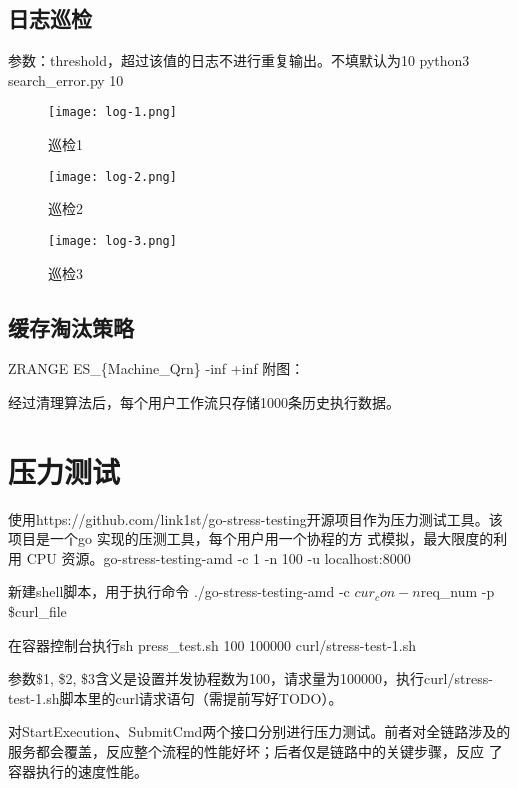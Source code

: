 \subsection{日志巡检}

参数：threshold，超过该值的日志不进行重复输出。不填默认为10
python3 search\_error.py 10

\begin{figure}
    \centering
    \texttt{[image: log-1.png]}
    \caption{巡检1}
    \label{fig:6-4-1}
\end{figure}

\begin{figure}
    \centering
    \texttt{[image: log-2.png]}
    \caption{巡检2}
    \label{fig:6-4-2}
\end{figure}

\begin{figure}
    \centering
    \texttt{[image: log-3.png]}
    \caption{巡检3}
    \label{fig:6-4-3}
\end{figure}

\subsection{缓存淘汰策略}
ZRANGE ES\_\{Machine\_Qrn\} -inf +inf
附图：

经过清理算法后，每个用户工作流只存储1000条历史执行数据。


\section{压力测试}


使用https://github.com/link1st/go-stress-testing开源项目作为压力测试工具。该项目是一个go 实现的压测工具，每个用户用一个协程的方
式模拟，最大限度的利用 CPU 资源。go-stress-testing-amd -c 1 -n 100 -u localhost:8000

新建shell脚本，用于执行命令 ./go-stress-testing-amd -c $cur_con -n $req\_num -p \$curl\_file

在容器控制台执行sh press\_test.sh 100 100000 curl/stress-test-1.sh\cite{zw5}

参数\$1, \$2, \$3含义是设置并发协程数为100，请求量为100000，执行curl/stress-test-1.sh脚本里的curl请求语句（需提前写好TODO）。

对StartExecution、SubmitCmd两个接口分别进行压力测试。前者对全链路涉及的服务都会覆盖，反应整个流程的性能好坏；后者仅是链路中的关键步骤，反应
了容器执行的速度性能。


